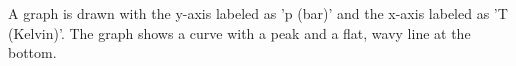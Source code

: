 A graph is drawn with the y-axis labeled as 'p (bar)' and the x-axis labeled as 'T (Kelvin)'. The graph shows a curve with a peak and a flat, wavy line at the bottom.